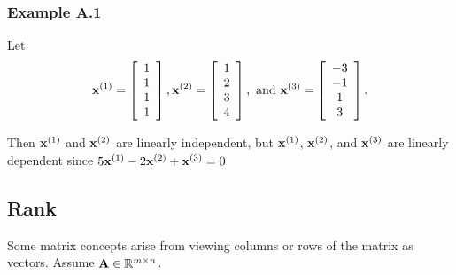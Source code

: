 \subsubsection*{Example A.1}

Let
$$
\mathbf{x}^{(1)} = \left[ \begin{array}{c} 1\\ 1\\ 1\\ 1\\ \end{array} \right], \mathbf{x}^{(2)} = \left[ \begin{array}{c} 1\\ 2\\ 3\\ 4\\ \end{array} \right], \mbox{ and } \mathbf{x}^{(3)} = \left[ \begin{array}{c} -3\\ -1\\ 1\\ 3\\ \end{array} \right].
$$

Then $\mathbf{x}^{(1)}$ and $\mathbf{x}^{(2)}$ are linearly independent, but $\mathbf{x}^{(1)}$, $\mathbf{x}^{(2)}$, and $\mathbf{x}^{(3)}$ are linearly dependent since $5\mathbf{x}^{(1)} - 2\mathbf{x}^{(2)} + \mathbf{x}^{(3)} = 0$


\subsection*{Rank}

Some matrix concepts arise from viewing columns or rows of the matrix as vectors.  Assume $\mathbf{A} \in \mathbb{R}^{m \times n}$.

